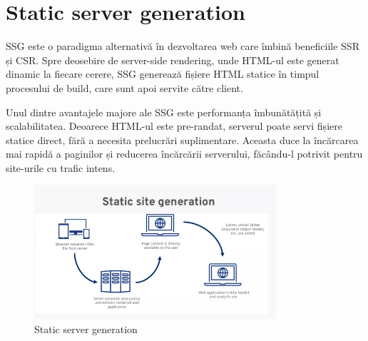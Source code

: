 \documentclass[12pt, a4paper]{report}
\begin{document}
\section{Static server generation}

SSG este o paradigma alternativă în dezvoltarea web care îmbină beneficiile SSR și CSR. Spre deosebire de server-side rendering, unde HTML-ul este generat dinamic la fiecare cerere, SSG generează fișiere HTML statice în timpul procesului de build, care sunt apoi servite către client.

Unul dintre avantajele majore ale SSG este performanța îmbunătățită și scalabilitatea. Deoarece HTML-ul este pre-randat, serverul poate servi fișiere statice direct, fără a necesita prelucrări suplimentare. Aceasta duce la încărcarea mai rapidă a paginilor și reducerea încărcării serverului, făcându-l potrivit pentru site-urile cu trafic intens. 

\begin{figure}[htbp]
	\centering
	\includegraphics[width=0.8\textwidth]{ssg-diagram.png}
	\caption{Static server generation \protect\footnotemark}
	\label{fig:ssg}
\end{figure}
\end{document}
